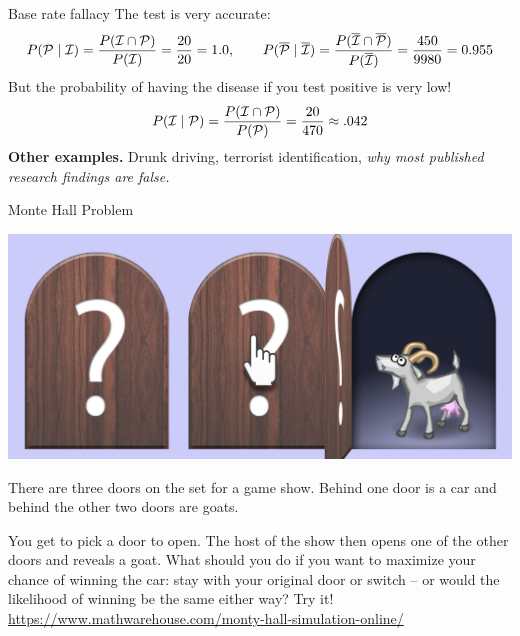 \documentclass[10pt]{beamer}
\begin{document}
\begin{frame}{Base rate fallacy}
The test is very accurate:
%
\begin{align*}
P(\mathcal{P} \; | \; \mathcal{I}) = \frac{P(\mathcal{I} \cap \mathcal{P})}{P(\mathcal{I})}  = \frac{20}{20} = 1.0, \qquad P(\overline{\mathcal{P}} \; | \; \overline{\mathcal{I}}) = \frac{P(\overline{\mathcal{I}} \cap \overline{\mathcal{P}})}{P(\overline{\mathcal{I}})}=  \frac{450}{9980} = 0.955
\end{align*}
%
But the probability of having the disease if you test positive is very low!
%
\begin{align*}
P(\mathcal{I} \; | \; \mathcal{P}) = \frac{P(\mathcal{I} \cap \mathcal{P})}{P(\mathcal{P})} = \frac{20}{470} \approx .042 
\end{align*}
\vfill 
\pause 
\colorbox{red!30}{\textbf{Other examples.}} Drunk driving, terrorist identification, \textit{why most published research findings are false.}

	
\end{frame}


\begin{frame}{Monte Hall Problem}
\small 
\begin{center}
\includegraphics[width=.6\textwidth]{images/monte_hall.png}	
\end{center}

There are three doors on the set for a game show. Behind one door is a car and behind the other two doors are goats. \\
\vfill 

You get to pick a door to open. The host of the show then opens one of the other doors and reveals a goat.  What should you do if you want to maximize your chance of winning the car: stay with your original door  or switch -- or would the likelihood of winning be the same either way?
\vfill \vfill 
\pause 
\colorbox{yellow!50}{Try it!} \quad 
\scriptsize  \url{https://www.mathwarehouse.com/monty-hall-simulation-online/}
\end{frame}
\end{document}
